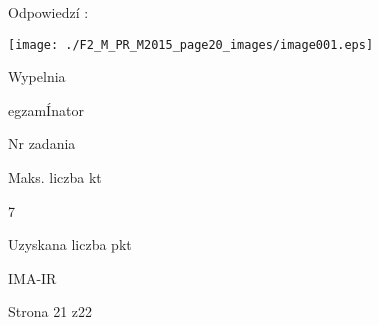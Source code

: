 \documentclass[a4paper,12pt]{article}
\begin{document}
Odpowiedzí :
\begin{center}
\texttt{[image: ./F2\_M\_PR\_M2015\_page20\_images/image001.eps]}
\end{center}
Wypelnia

egzamÍnator

Nr zadania

Maks. liczba kt

7

Uzyskana liczba pkt

IMA-IR

Strona 21 z22
\end{document}
